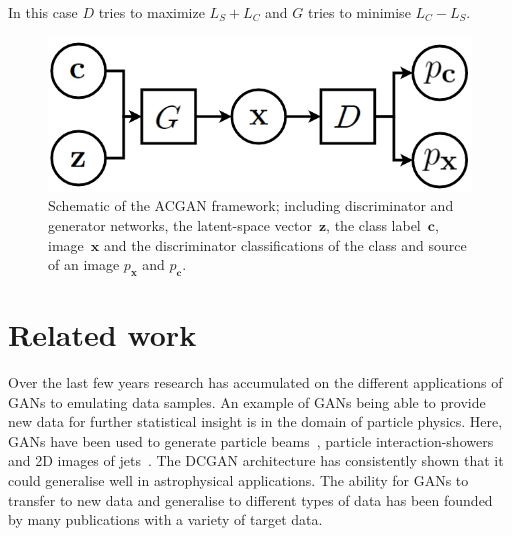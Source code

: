 \documentclass[twocolumn]{article}
\numberwithin{equation}{section}
\begin{document}
In this case $D$ tries to maximize $L_S + L_C$ and $G$ tries to minimise $L_C - L_S$.


\begin{figure}
\includegraphics[width=\columnwidth]{figures/diagrams/ACGAN_diagram.png}
\centering
\caption{Schematic of the ACGAN framework; including discriminator and generator networks, the latent-space 
         vector~$\mathbf{z}$, the class label~$\mathbf{c}$, image~$\mathbf{x}$ and the discriminator 
         classifications of the class and source of an image $p_{\mathbf{x}}$ and $p_\mathbf{c}$.}
\label{fig:GAN_diagram}
\end{figure}




\section{Related work}\label{sec:related_work}
Over the last few years research has accumulated on the different applications of GANs to emulating data samples. An 
example of GANs being able to provide new data for further statistical insight is in the domain of particle physics. Here, 
GANs have been used to generate particle beams~\cite{muon_beams_gan}, particle interaction-showers~\cite{particle_showers_gan} 
and 2D images of jets~\cite{particle_jets_gan}. The DCGAN architecture has consistently shown that it could generalise well 
in astrophysical applications. The ability for GANs to transfer to new data and generalise to different types of data has 
been founded by many publications with a variety of target data.
\end{document}

